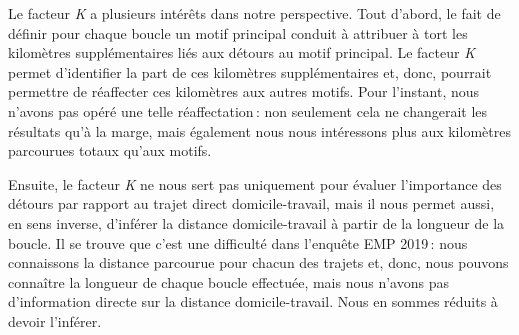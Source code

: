 \documentclass[
  9pt,
  a4paper,
  DIV=11]{scrreprt}
\begin{document}
Le facteur \emph{K} a plusieurs intérêts dans notre perspective. Tout
d'abord, le fait de définir pour chaque boucle un motif principal
conduit à attribuer à tort les kilomètres supplémentaires liés aux
détours au motif principal. Le facteur \emph{K} permet d'identifier la
part de ces kilomètres supplémentaires et, donc, pourrait permettre de
réaffecter ces kilomètres aux autres motifs. Pour l'instant, nous
n'avons pas opéré une telle réaffectation\,: non seulement cela ne
changerait les résultats qu'à la marge, mais également nous nous
intéressons plus aux kilomètres parcourues totaux qu'aux motifs.

Ensuite, le facteur \emph{K} ne nous sert pas uniquement pour évaluer
l'importance des détours par rapport au trajet direct domicile-travail,
mais il nous permet aussi, en sens inverse, d'inférer la distance
domicile-travail à partir de la longueur de la boucle. Il se trouve que
c'est une difficulté dans l'enquête EMP 2019\,: nous connaissons la
distance parcourue pour chacun des trajets et, donc, nous pouvons
connaître la longueur de chaque boucle effectuée, mais nous n'avons pas
d'information directe sur la distance domicile-travail. Nous en sommes
réduits à devoir l'inférer.
\end{document}
